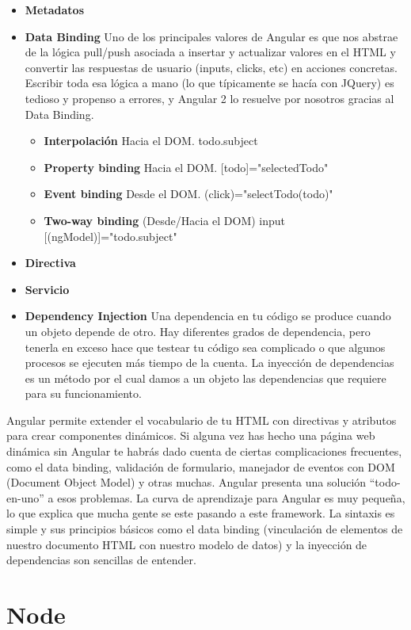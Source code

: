 \begin{itemize}
\item \textbf{Metadatos}
\item \textbf{Data Binding} Uno de los principales valores de Angular es que nos abstrae de la lógica pull/push asociada a insertar y actualizar valores en el HTML y convertir las respuestas de usuario (inputs, clicks, etc) en acciones concretas. Escribir toda esa lógica a mano (lo que típicamente se hacía con JQuery) es tedioso y propenso a errores, y Angular 2 lo resuelve por nosotros gracias al Data Binding.
\begin{itemize}
\item \textbf{Interpolación} Hacia el DOM.
{{todo.subject}}
\item \textbf{Property binding} Hacia el DOM. 
[todo]="selectedTodo"
\item \textbf{Event binding} Desde el DOM. (click)="selectTodo(todo)"

\item \textbf{Two-way binding} (Desde/Hacia el DOM) input [(ngModel)]="todo.subject"
\end{itemize}
\item \textbf{Directiva}
\item \textbf{Servicio}
\item \textbf{Dependency Injection}  Una dependencia en tu código se produce cuando un objeto depende de otro. Hay diferentes grados de dependencia, pero tenerla en exceso hace que testear tu código sea complicado o que algunos procesos se ejecuten más tiempo de la cuenta.
La inyección de dependencias es un método por el cual damos a un objeto las dependencias que requiere para su funcionamiento. 
\end{itemize}

Angular permite extender el vocabulario de tu HTML con directivas y atributos para crear componentes dinámicos. Si alguna vez has hecho una página web dinámica sin Angular te habrás dado cuenta de ciertas complicaciones frecuentes, como el data binding, validación de formulario, manejador de eventos con DOM (Document Object Model) y otras muchas. Angular presenta una solución “todo-en-uno” a esos problemas.
La curva de aprendizaje para Angular es muy pequeña, lo que explica que mucha gente se este pasando a este framework. La sintaxis es simple y sus principios básicos como el data binding (vinculación de elementos de nuestro documento HTML con nuestro modelo de datos) y la inyección de dependencias son sencillas de entender.


\section{Node}

